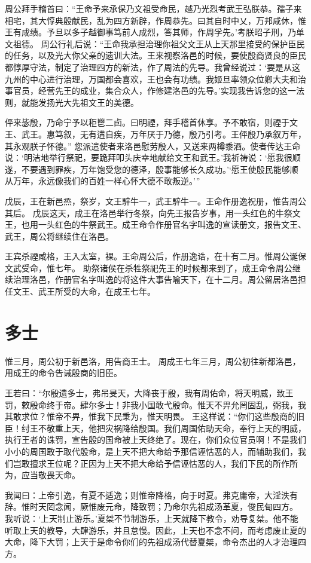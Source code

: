 \documentclass[a4paper,12pt,UTF8,twoside]{ctexbook}
\begin{document}
周公拜手稽首曰：“王命予来承保乃文祖受命民，越乃光烈考武王弘朕恭。孺子来相宅，其大惇典殷献民，乱为四方新辟，作周恭先。曰其自时中乂，万邦咸休，惟王有成绩。予旦以多子越御事笃前人成烈，答其师，作周孚先。’考朕昭子刑，乃单文祖德。
周公行礼后说：“王命我承担治理你祖父文王从上天那里接受的保护臣民的任务，以及光大你父亲的遗训大法。王来视察洛邑的时候，要使殷商贤良的臣民都惇厚守法，制定了治理四方的新法，作了周法的先导。我曾经说过：‘要是从这九州的中心进行治理，万国都会喜欢，王也会有功绩。我姬旦率领众位卿大夫和治事官员，经营先王的成业，集合众人，作修建洛邑的先导。’实现我告诉您的这一法则，就能发扬光大先祖文王的美德。

伻来毖殷，乃命宁予以秬鬯二卣。曰明禋，拜手稽首休享。予不敢宿，则禋于文王、武王。惠笃叙，无有遘自疾，万年厌于乃德，殷乃引考。王伻殷乃承叙万年，其永观朕子怀德。”
您派遣使者来洛邑慰劳殷人，又送来两樽黍酒。使者传达王命说：‘明洁地举行祭祀，要跪拜叩头庆幸地献给文王和武王。’我祈祷说：‘愿我很顺遂，不要遇到罪疾，万年饱受您的德泽，殷事能够长久成功。’‘愿王使殷民能够顺从万年，永远像我们的百姓一样心怀大德不敢叛逆。’”

戊辰，王在新邑烝，祭岁，文王騂牛一，武王騂牛一。王命作册逸祝册，惟告周公其后。
戊辰这天，成王在洛邑举行冬祭，向先王报告岁事，用一头红色的牛祭文王，也用一头红色的牛祭武王。成王命令作册官名字叫逸的宣读册文，报告文王、武王，周公将继续住在洛邑。

王宾杀禋咸格，王入太室，裸。王命周公后，作册逸诰，在十有二月。惟周公诞保文武受命，惟七年。
助祭诸侯在杀牲祭祀先王的时候都来到了，成王命令周公继续治理洛邑，作册官名字叫逸的将这件大事告喻天下，在十二月。周公留居洛邑担任文王、武王所受的大命，在成王七年。

\chapter{多士}

惟三月，周公初于新邑洛，用告商王士。
周成王七年三月，周公初往新都洛邑，用成王的命令告诫殷商的旧臣。

王若曰：“尔殷遗多士，弗吊旻天，大降丧于殷，我有周佑命，将天明威，致王罚，敕殷命终于帝。肆尔多士！非我小国敢弋殷命。惟天不畀允罔固乱，弼我，我其敢求位？惟帝不畀，惟我下民秉为，惟天明畏。
王这样说：“你们这些殷商的旧臣！纣王不敬重上天，他把灾祸降给殷国。我们周国佑助天命，奉行上天的明威，执行王者的诛罚，宣告殷的国命被上天终绝了。现在，你们众位官员啊！不是我们小小的周国敢于取代殷命，是上天不把大命给予那信诬怙恶的人，而辅助我们，我们岂敢擅求王位呢？正因为上天不把大命给予信诬怙恶的人，我们下民的所作所为，应当敬畏天命。

我闻曰：上帝引逸，有夏不适逸；则惟帝降格，向于时夏。弗克庸帝，大淫泆有辞。惟时天罔念闻，厥惟废元命，降致罚；乃命尔先祖成汤革夏，俊民甸四方。
我听说：‘上天制止游乐。’夏桀不节制游乐，上天就降下教令，劝导复桀。他不能听取上天的教导，大肆游乐，并且怠慢。因此，上天也不念不问，而考虑废止夏的大命，降下大罚；上天于是命令你们的先祖成汤代替夏桀，命令杰出的人才治理四方。
\end{document}
